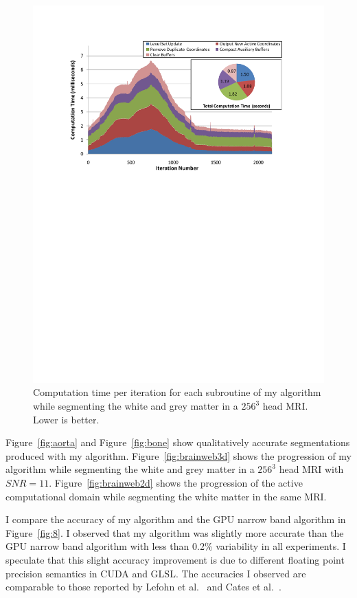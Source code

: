 \begin{figure}[t]
\centering
\includegraphics[width=6.0in]{figures/SpeedD1.pdf}
\caption{Computation time per iteration for each subroutine of my algorithm while segmenting the white and grey matter in a $256^3$ head MRI. Lower is better.}
\label{fig:speedpersubroutine}
\end{figure}

Figure~\ref{fig:aorta} and Figure~\ref{fig:bone} show qualitatively accurate segmentations produced with my algorithm. Figure~\ref{fig:brainweb3d} shows the progression of my algorithm while segmenting the white and grey matter in a ${256}^3$ head MRI with $SNR=11$. Figure~\ref{fig:brainweb2d} shows the progression of the active computational domain while segmenting the white matter in the same MRI.

I compare the accuracy of my algorithm and the GPU narrow band algorithm in Figure~\ref{fig:8}. I observed that my algorithm was slightly more accurate than the GPU narrow band algorithm with less than 0.2\% variability in all experiments. I speculate that this slight accuracy improvement is due to different floating point precision semantics in CUDA and GLSL. The accuracies I observed are comparable to those reported by Lefohn et al.~\cite{Lefohn-2003-MICCAI} and Cates et al.~\cite{Cates-2004}.

